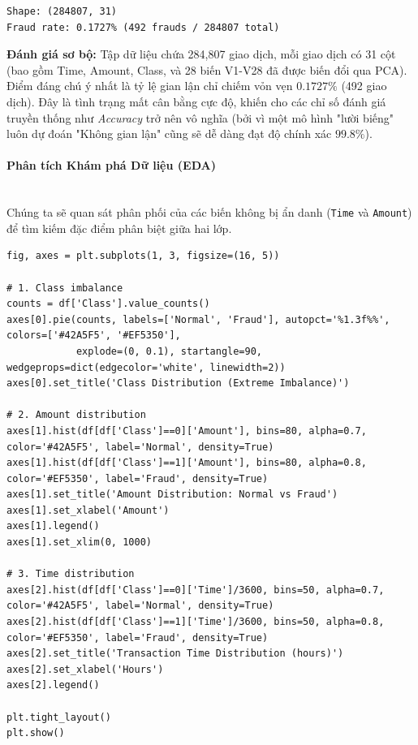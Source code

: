 \begin{lstlisting}[style=consoleoutput, caption={Thông số cấu trúc của tập dữ liệu Gian lận Thẻ tín dụng}]
Shape: (284807, 31)
Fraud rate: 0.1727% (492 frauds / 284807 total)
\end{lstlisting}

\textbf{Đánh giá sơ bộ:} Tập dữ liệu chứa 284,807 giao dịch, mỗi giao dịch có 31 cột (bao gồm Time, Amount, Class, và 28 biến V1-V28 đã được biến đổi qua PCA). Điểm đáng chú ý nhất là tỷ lệ gian lận chỉ chiếm vỏn vẹn $0.1727\%$ (492 giao dịch). Đây là tình trạng mất cân bằng cực độ, khiến cho các chỉ số đánh giá truyền thống như \textit{Accuracy} trở nên vô nghĩa (bởi vì một mô hình "lười biếng" luôn dự đoán "Không gian lận" cũng sẽ dễ dàng đạt độ chính xác $99.8\%$).

\paragraph{Phân tích Khám phá Dữ liệu (EDA)} \hfill \\

Chúng ta sẽ quan sát phân phối của các biến không bị ẩn danh (\texttt{Time} và \texttt{Amount}) để tìm kiếm đặc điểm phân biệt giữa hai lớp.

\begin{lstlisting}[style=pythoncode, caption={Visualize class distribution, transaction amount, and time frequency}]
fig, axes = plt.subplots(1, 3, figsize=(16, 5))

# 1. Class imbalance
counts = df['Class'].value_counts()
axes[0].pie(counts, labels=['Normal', 'Fraud'], autopct='%1.3f%%', colors=['#42A5F5', '#EF5350'],
            explode=(0, 0.1), startangle=90, wedgeprops=dict(edgecolor='white', linewidth=2))
axes[0].set_title('Class Distribution (Extreme Imbalance)')

# 2. Amount distribution
axes[1].hist(df[df['Class']==0]['Amount'], bins=80, alpha=0.7, color='#42A5F5', label='Normal', density=True)
axes[1].hist(df[df['Class']==1]['Amount'], bins=80, alpha=0.8, color='#EF5350', label='Fraud', density=True)
axes[1].set_title('Amount Distribution: Normal vs Fraud')
axes[1].set_xlabel('Amount')
axes[1].legend()
axes[1].set_xlim(0, 1000)

# 3. Time distribution
axes[2].hist(df[df['Class']==0]['Time']/3600, bins=50, alpha=0.7, color='#42A5F5', label='Normal', density=True)
axes[2].hist(df[df['Class']==1]['Time']/3600, bins=50, alpha=0.8, color='#EF5350', label='Fraud', density=True)
axes[2].set_title('Transaction Time Distribution (hours)')
axes[2].set_xlabel('Hours')
axes[2].legend()

plt.tight_layout()
plt.show()
\end{lstlisting}

